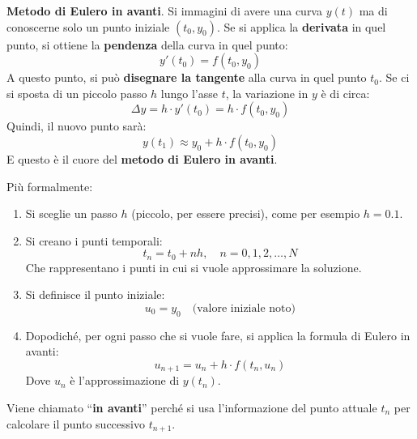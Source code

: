 \begin{itemize}
    \textbf{Metodo di Eulero in avanti}. Si immagini di avere una curva $y(t)$ ma di conoscerne solo un punto iniziale $(t_0, y_0)$. Se si applica la \textbf{derivata} in quel punto, si ottiene la \textbf{pendenza} della curva in quel punto:
    \begin{equation*}
        y'(t_0) = f(t_0, y_0)
    \end{equation*}
    A questo punto, si può \textbf{disegnare la tangente} alla curva in quel punto $t_{0}$. Se ci si sposta di un piccolo passo $h$ lungo l'asse $t$, la variazione in $y$ è di circa:
    \begin{equation*}
        \Delta y = h \cdot y'(t_0) = h \cdot f(t_0, y_0)
    \end{equation*}
    Quindi, il nuovo punto sarà:
    \begin{equation*}
        y(t_1) \approx y_0 + h \cdot f(t_0, y_0)
    \end{equation*}
    E questo è il cuore del \textbf{metodo di Eulero in avanti}.

    Più formalmente:
    \begin{enumerate}
        \item Si sceglie un passo $h$ (piccolo, per essere precisi), come per esempio $h = 0.1$.
        \item Si creano i punti temporali:
        \begin{equation*}
            t_n = t_0 + n h, \quad n = 0, 1, 2, \dots, N
        \end{equation*}
        Che rappresentano i punti in cui si vuole approssimare la soluzione.
        \item Si definisce il punto iniziale:
        \begin{equation*}
            u_0 = y_0 \quad \text{(valore iniziale noto)}
        \end{equation*}
        \item Dopodiché, per ogni passo che si vuole fare, si applica la formula di Eulero in avanti:
        \begin{equation*}
            u_{n+1} = u_n + h \cdot f(t_n, u_n)
        \end{equation*}
        Dove $u_n$ è l'approssimazione di $y(t_n)$.
    \end{enumerate}
    Viene chiamato ``\textbf{in avanti}'' perché si usa l'informazione del punto attuale $t_n$ per calcolare il punto successivo $t_{n+1}$.


\end{itemize}
